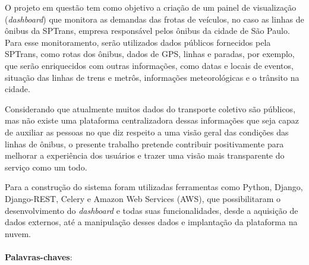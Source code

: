 \begin{resumo}
\indent
\par O projeto em questão tem como objetivo a criação de um painel de visualização (\textit{dashboard}) que monitora as demandas das   frotas   de veículos, no caso as linhas de ônibus da SPTrans, empresa responsável pelos ônibus da cidade de São Paulo. Para esse monitoramento, serão utilizados dados públicos fornecidos pela SPTrans, como rotas dos ônibus, dados de GPS, linhas e paradas, por exemplo, que serão enriquecidos com outras informações, como datas e locais de eventos, situação das linhas de trens e metrôs, informações meteorológicas e o trânsito na cidade.
\par Considerando que atualmente muitos dados do transporte coletivo são públicos, mas não existe uma plataforma centralizadora dessas informações que seja capaz de auxiliar as pessoas no que diz respeito a uma visão geral das condições das linhas de ônibus, o presente trabalho pretende contribuir positivamente para melhorar a experiência dos usuários e trazer uma visão mais transparente do serviço como um todo.
\par Para a construção do sistema foram utilizadas ferramentas como Python, Django, Django-REST, Celery e Amazon Web Services (AWS), que possibilitaram o desenvolvimento do \textit{dashboard} e todas suas funcionalidades, desde a aquisição de dados externos, até a manipulação desses dados e implantação da plataforma na nuvem.
\\
\\
\textbf{Palavras-chaves}: ~

\end{resumo}
